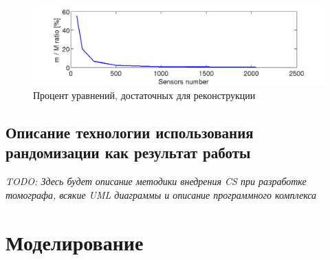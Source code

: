 \documentclass[14pt]{matmex-diploma}
\begin{document}
\begin{figure}[h]
\centering
    \includegraphics[width=1\textwidth]{pics/percents.png}
	\caption{Процент уравнений, достаточных для реконструкции}
	\label{fig:percents}
\end{figure}



\subsection{Описание технологии использования рандомизации как результат работы}
\textit{TODO: Здесь будет описание методики внедрения CS при разработке томографа, всякие UML диаграммы и описание программного комплекса} \\


\section{Моделирование}
\end{document}
